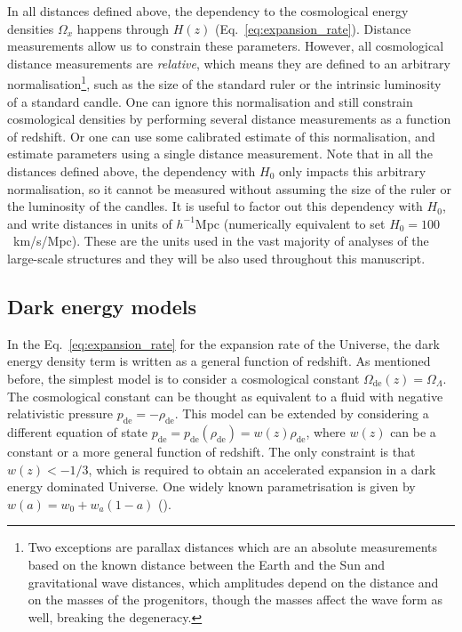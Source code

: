     In all distances defined above, the dependency to the cosmological energy densities
    $\Omega_x$ happens through $H(z)$ (Eq.~\ref{eq:expansion_rate}). 
    Distance measurements allow us to constrain these parameters. 
    However, all cosmological distance measurements are \emph{relative}, 
    which means they are defined to an arbitrary 
    normalisation\footnote{Two exceptions are parallax distances which are an absolute measurements
    based on the known distance between the Earth and the Sun and gravitational wave distances,
    which amplitudes depend on the distance and on the masses of the progenitors, though
    the masses affect the wave form as well, breaking the degeneracy.}, 
    such as the size of the standard ruler or the intrinsic luminosity of a standard candle.  
    One can ignore this normalisation and still constrain cosmological densities by 
    performing several distance measurements as a function of redshift.
    Or one can use some calibrated estimate of this normalisation, and estimate parameters 
    using a single distance measurement. 
    Note that in all the distances defined above, the dependency with $H_0$ only impacts
    this arbitrary normalisation, so it cannot be measured without assuming 
    the size of the ruler or the luminosity of the candles. 
    It is useful to factor out this dependency with $H_0$, and write distances 
    in units of $h^{-1}$Mpc (numerically equivalent to set $H_0 = 100$~km/s/Mpc). 
    These are the units used in the vast majority of analyses of the large-scale structures 
    and they will be also used throughout this manuscript. 
    
    \subsection{Dark energy models}
    \label{intro:model:dark_energy_models}

    In the Eq.~\ref{eq:expansion_rate} for the expansion rate of the Universe, 
    the dark energy density term is written as a general function of redshift.
    As mentioned before, the simplest model is to consider a cosmological constant
    $\Omega_\mathrm{de}(z) = \Omega_\Lambda$.  
    The cosmological constant can be thought as equivalent to a fluid with 
    negative relativistic pressure $p_\mathrm{de} = -\rho_\mathrm{de}$. 
    This model can be extended by considering a different equation of state 
    $p_\mathrm{de} = p_\mathrm{de}(\rho_\mathrm{de}) = w(z) \rho_\mathrm{de}$, 
    where $w(z)$ can be a constant or a more general function of redshift.
    The only constraint is that $w(z) < -1/3$, which is required to obtain 
    an accelerated expansion in a dark energy dominated Universe. 
    One widely known parametrisation is given by $w(a) = w_0 + w_a(1-a)$ 
    (\cite{chevallierAcceleratingUniversesScaling2001, linderExploringExpansionHistory2003}). 
    
